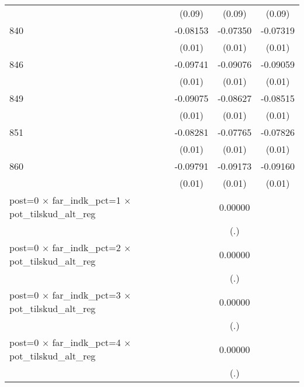 \begin{table}[htbp]
\begin{tabular}{l*{3}{c}}
                    &      (0.09)         &      (0.09)         &      (0.09)         \\
840                 &    -0.08153\sym{***}&    -0.07350\sym{***}&    -0.07319\sym{***}\\
                    &      (0.01)         &      (0.01)         &      (0.01)         \\
846                 &    -0.09741\sym{***}&    -0.09076\sym{***}&    -0.09059\sym{***}\\
                    &      (0.01)         &      (0.01)         &      (0.01)         \\
849                 &    -0.09075\sym{***}&    -0.08627\sym{***}&    -0.08515\sym{***}\\
                    &      (0.01)         &      (0.01)         &      (0.01)         \\
851                 &    -0.08281\sym{***}&    -0.07765\sym{***}&    -0.07826\sym{***}\\
                    &      (0.01)         &      (0.01)         &      (0.01)         \\
860                 &    -0.09791\sym{***}&    -0.09173\sym{***}&    -0.09160\sym{***}\\
                    &      (0.01)         &      (0.01)         &      (0.01)         \\
post=0 $\times$ far\_indk\_pct=1 $\times$ pot\_tilskud\_alt\_reg&                     &     0.00000         &                     \\
                    &                     &         (.)         &                     \\
post=0 $\times$ far\_indk\_pct=2 $\times$ pot\_tilskud\_alt\_reg&                     &     0.00000         &                     \\
                    &                     &         (.)         &                     \\
post=0 $\times$ far\_indk\_pct=3 $\times$ pot\_tilskud\_alt\_reg&                     &     0.00000         &                     \\
                    &                     &         (.)         &                     \\
post=0 $\times$ far\_indk\_pct=4 $\times$ pot\_tilskud\_alt\_reg&                     &     0.00000         &                     \\
                    &                     &         (.)         &                     \\

\end{tabular}
\end{table}
